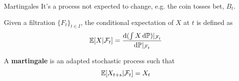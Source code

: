 

\begin{frame}{Martingales}
	It's a process not expected to change, e.g. the coin tosses bet, $B_t$.

	\vfill
	\begin{definition}
		Given a filtration $\{F_t\}_{t \in I}$, the conditional expectation of $X$ at $t$ is defined as
		\begin{equation*}
			\mathbb{E}[X | \mathcal{F}_t] = \frac{\mathrm{d}{(\int X \, \mathrm{d}\mathbb{P})\vert_{\mathcal{F}_t}}}{\mathrm{d}{\mathbb{P}\vert_{\mathcal{F}_t}}}
		\end{equation*}
	\end{definition}
	\begin{definition}
		A \textbf{martingale} is an adapted stochastic process such that
		\begin{equation*}
			\mathbb{E}[ X_{t+s} | \mathcal{F}_t] = X_t
		\end{equation*}
	\end{definition}
\end{frame}




